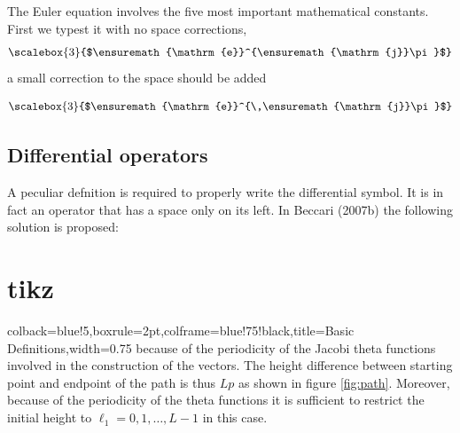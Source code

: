 {

The Euler equation involves the five most important mathematical constants. First we typest it with no space corrections,
\providecommand*{\eu}%
{\ensuremath{\mathrm{e}}}
\providecommand*{\iu}%
{\ensuremath{\mathrm{j}}}
\[\scalebox{3}{$\eu^{\iu\pi}$}\]
a small correction to the space should be added

\[\scalebox{3}{$\eu^{\,\iu\pi}$}\]

\subsection{Differential operators}
A peculiar defnition is required to properly
write the differential symbol. It is in fact an operator that has a space only on its left. In Beccari (2007b) the following solution is proposed:

\bigskip


\clearpage
\section{tikz}
\begin{tcblisting}{colback=blue!5,boxrule=2pt,colframe=blue!75!black,title=Basic Definitions,width=0.75\textwidth}
because of the periodicity of the Jacobi theta functions involved in the construction of the vectors.
The height difference between starting point and endpoint of the path is thus $Lp$ as shown in figure \ref{fig:path}. Moreover, because of the periodicity of the theta functions it is sufficient to restrict the initial height to $\ell_1=0,1,\dots,L-1$ in this case.
  \centering
\end{tcblisting}
\clearpage


}

